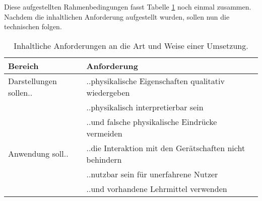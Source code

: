 Diese aufgestellten Rahmenbedingungen fasst Tabelle \ref{tab:req} noch einmal zusammen. Nachdem die inhaltlichen Anforderung aufgestellt wurden, sollen nun die technischen folgen.

\bgroup
\setlength\extrarowheight{0pt}
\def\arraystretch{1.25}
\begin{table}[h!]
	\centering
	\begin{tabular}{l|l}
		Bereich & Anforderung\\
		\hline
		\hline
		Darstellungen sollen.. & ..physikalische Eigenschaften qualitativ wiedergeben\\
		 & ..physikalisch interpretierbar sein\\
		 & ..und falsche physikalische Eindrücke vermeiden\\
		 \hline
		Anwendung soll.. & ..die Interaktion mit den Gerätschaften nicht behindern\\
		 & ..nutzbar sein für unerfahrene Nutzer \\
		 & ..und vorhandene Lehrmittel verwenden
	\end{tabular}\caption{\label{tab:req} Inhaltliche Anforderungen an die Art und Weise einer Umsetzung.}
\end{table}
\egroup

\begin{comment}
Diese Anforderung verlangen dabei nicht notwendigerweise (rein) virtuelle Repräsentationen für die genannten Elemente. Auch wenn der Fokus auf über die HoloLens visualisierten Daten liegt, so könnte es für manche Elemente sinnvoller sein, auf andere Optionen zurückzugreifen. Das können reale statt virtueller Objekte sein aber auch akustische Informationen, die über die integrierten Lautsprecher der HoloLens wiedergegeben werden. Die Frage, was visualisiert und auch was nicht visualisiert wird, ist also durch ein Design zu beantworten.\\

Neben diesen inhaltlichen Anforderungen sind von Seiten der Physik auch Anforderungen an die Anwendung zu stellen. Hier wurden die Folgenden herausgearbeitet:\\[4px]

\vspace{6px}
Der erste Punkt soll hier kurz näher beleuchtet werden. Dabei geht es nicht um möglichst exakte Werte und Darstellungen. Vielmehr sollen sie physikalisch interpretierbar sein, indem auf etablierte Modelle zurückgegriffen wird. Außerdem sollen sie keine falschen Eindrücke vermitteln und die physikalischen Zusammenhänge korrekt widerspiegeln.\\
\end{comment}

